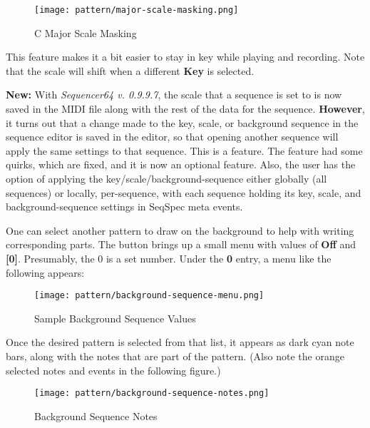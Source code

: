 \begin{figure}[H]
   \centering 
   \texttt{[image: pattern/major-scale-masking.png]}
   \caption{C Major Scale Masking}
   \label{fig:pattern_editor_major_scale_masking}
\end{figure}

   This feature makes it a bit easier to stay in key while playing and
   recording.  Note that the scale will shift when a different
   \textbf{Key} is selected.

   \textbf{New:}
   With \textsl{Sequencer64 v. 0.9.9.7}, the scale that a sequence is set to is
   now saved in the MIDI file along with the rest of the data for the sequence.
   \textbf{However},
   it turns out that a change made to the key, scale, or background sequence in
   the sequence editor is saved in the editor, so that opening another sequence
   will apply the same settings to that sequence.  This is a feature.
   The feature had some quirks, which are fixed, and it is now
   an optional feature.
   Also, the user has the option of applying the key/scale/background-sequence
   either globally (all sequences) or locally, per-sequence, with each sequence
   holding its key, scale, and background-sequence settings in
   SeqSpec meta events.

   One can select another pattern to draw on the background to help with
   writing corresponding parts.
   The button brings up a small menu with values of \textbf{Off} and
   \textbf{[0]}.  Presumably, the 0 is a set number.  Under the \textbf{0}
   entry, a menu like the following appears:

\begin{figure}[H]
   \centering 
   \texttt{[image: pattern/background-sequence-menu.png]}
   \caption{Sample Background Sequence Values}
   \label{fig:pattern_editor_background_sequence_menu}
\end{figure}

   Once the desired pattern is selected from that list, it appears as
   dark cyan note bars, along with the notes that are part of the pattern.
   (Also note the orange selected notes and events in the following figure.)

\begin{figure}[H]
   \centering 
   \texttt{[image: pattern/background-sequence-notes.png]}
   \caption{Background Sequence Notes}
   \label{fig:pattern_editor_background_sequence_notes}
\end{figure}

